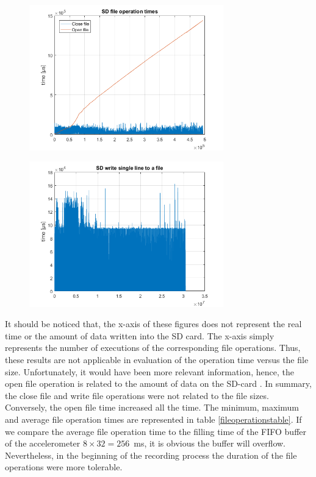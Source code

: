 \documentclass[english,12pt,a4paper,pdftex,elec,utf8]{aaltothesis}
\begin{document}
\begin{figure}[h]
\centering
\includegraphics[width = 0.75\textwidth]{figures/openclosetimes_vanha.png}
\caption{} \label{openclosetimes_old}
\end{figure}

\begin{figure}[h]
\centering
\includegraphics[width = 0.75\textwidth]{figures/writetimes_vanharauta.png}
\caption{} \label{writetimes_old}
\end{figure}

It should be noticed that, the x-axis of these figures does not represent the real time or the amount of data written into the SD card. The x-axis simply represents the number of executions of the corresponding file operations. Thus, these results are not applicable in evaluation of the operation time versus the file size. Unfortunately, it would have been more relevant information, hence, the open file operation is related to the amount of data on the SD-card \cite{spimanual}. In summary, the close file and write file operations were not related to the file sizes. Conversely, the open file time increased all the time. The minimum, maximum and average file operation times are represented in table \ref{fileoperationstable}. If we compare the average file operation time to the filling time of the FIFO buffer of the accelerometer $8 \times 32=256$\SI{}{\milli\second}, it is obvious the buffer will overflow. Nevertheless, in the beginning of the recording process the duration of the file operations were more tolerable.
\end{document}
